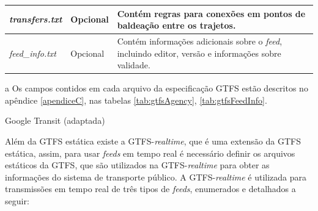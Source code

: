\documentclass[
	12pt,				%
	oneside,			%
	a4paper,			%
	english,			%
	brazil				%
	]{abntex2ppgsi}
\begin{document}
\begin{table}[!htb]
\begin{threeparttable}
\begin{tabular}{>{\centering\arraybackslash}m{3.5cm} | >{\centering}m{3cm} | >{\centering\arraybackslash}m{8cm}}
\hline
\textit{transfers.txt }& Opcional & Contém regras para conexões em pontos de baldeação entre os trajetos. \\
\hline
\textit{feed\_info.txt} & Opcional & Contém informações adicionais sobre o \textit{feed}, incluindo editor, versão e informações sobre validade. \\
\bottomrule
  \end{tabular}
  \begin{tablenotes}
            \item[a] Os campos contidos em cada arquivo da especificação GTFS estão descritos no apêndice \ref{apendiceC}, nas tabelas \ref{tab:gtfsAgency}, \ref{tab:gtfsFeedInfo}.
        \end{tablenotes}
\end{threeparttable}
 Google Transit (adaptada)
\end{table}

Além da GTFS estática existe a GTFS-\textit{realtime}, que é uma extensão da GTFS estática, assim, para usar \textit{feeds} em tempo real é necessário definir os arquivos estáticos da GTFS, que são utilizados na GTFS-\textit{realtime} para obter as informações do sistema de transporte público. A GTFS-\textit{realtime} é utilizada para transmissões em tempo real de três tipos de \textit{feeds}, enumerados e detalhados a seguir:
\end{document}
